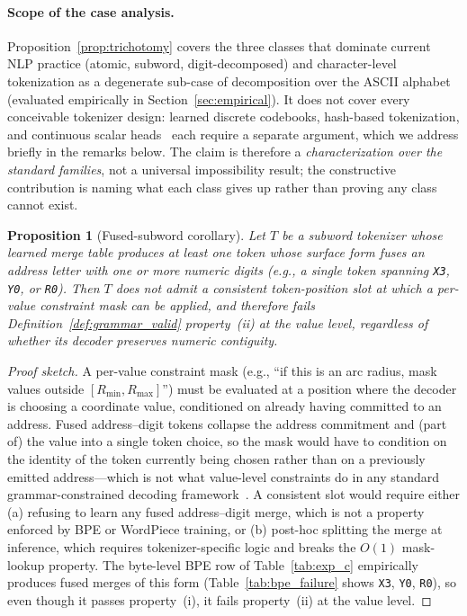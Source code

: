 \documentclass[11pt]{article}
\newtheorem{proposition}[definition]{Proposition}
\begin{document}
\paragraph{Scope of the case analysis.}
Proposition~\ref{prop:trichotomy} covers the three classes that dominate current NLP practice (atomic, subword, digit-decomposed) and character-level tokenization as a degenerate sub-case of decomposition over the ASCII alphabet (evaluated empirically in Section~\ref{sec:empirical}). It does not cover every conceivable tokenizer design: learned discrete codebooks, hash-based tokenization, and continuous scalar heads~\cite{xval} each require a separate argument, which we address briefly in the remarks below. The claim is therefore a \emph{characterization over the standard families}, not a universal impossibility result; the constructive contribution is naming what each class gives up rather than proving any class cannot exist.

\begin{proposition}[Fused-subword corollary]
\label{prop:fused_subword}
Let $T$ be a subword tokenizer whose learned merge table produces at least one token whose surface form fuses an address letter with one or more numeric digits (e.g., a single token spanning \texttt{X3}, \texttt{Y0}, or \texttt{R0}). Then $T$ does not admit a consistent token-position slot at which a per-value constraint mask can be applied, and therefore fails Definition~\ref{def:grammar_valid} property~(ii) at the value level, regardless of whether its decoder preserves numeric contiguity.
\end{proposition}

\begin{proof}[Proof sketch]
A per-value constraint mask (e.g., ``if this is an arc radius, mask values outside $[R_{\min}, R_{\max}]$'') must be evaluated at a position where the decoder is choosing a coordinate value, conditioned on already having committed to an address. Fused address--digit tokens collapse the address commitment and (part of) the value into a single token choice, so the mask would have to condition on the identity of the token currently being chosen rather than on a previously emitted address---which is not what value-level constraints do in any standard grammar-constrained decoding framework~\cite{outlines,xgrammar,picard}. A consistent slot would require either (a) refusing to learn any fused address--digit merge, which is not a property enforced by BPE or WordPiece training, or (b) post-hoc splitting the merge at inference, which requires tokenizer-specific logic and breaks the $O(1)$ mask-lookup property. The byte-level BPE row of Table~\ref{tab:exp_c} empirically produces fused merges of this form (Table~\ref{tab:bpe_failure} shows \texttt{X3}, \texttt{Y0}, \texttt{R0}), so even though it passes property~(i), it fails property~(ii) at the value level.
\end{proof}
\end{document}
